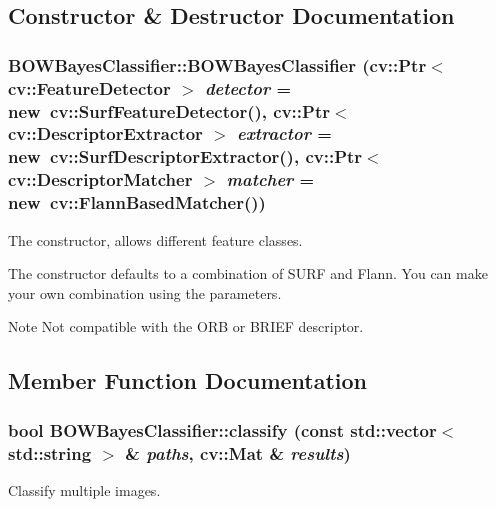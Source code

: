 \subsection{Constructor \& Destructor Documentation}
\hypertarget{classBOWBayesClassifier_ab0714186c37d370dfd71b02ff3de81e6}{
\subsubsection[{BOWBayesClassifier}]{\setlength{\rightskip}{0pt plus 5cm}BOWBayesClassifier::BOWBayesClassifier (cv::Ptr$<$ cv::FeatureDetector $>$ {\em detector} = {\ttfamily new~cv::SurfFeatureDetector()}, \/  cv::Ptr$<$ cv::DescriptorExtractor $>$ {\em extractor} = {\ttfamily new~cv::SurfDescriptorExtractor()}, \/  cv::Ptr$<$ cv::DescriptorMatcher $>$ {\em matcher} = {\ttfamily new~cv::FlannBasedMatcher()})}}
\label{classBOWBayesClassifier_ab0714186c37d370dfd71b02ff3de81e6}


The constructor, allows different feature classes. 

The constructor defaults to a combination of SURF and Flann. You can make your own combination using the parameters.

\begin{DoxyNote}{Note}
Not compatible with the ORB or BRIEF descriptor. 
\end{DoxyNote}


\subsection{Member Function Documentation}
\hypertarget{classBOWBayesClassifier_a3e2cf634f1f63dd14de1ca658b19cb39}{
\subsubsection[{classify}]{\setlength{\rightskip}{0pt plus 5cm}bool BOWBayesClassifier::classify (const std::vector$<$ std::string $>$ \& {\em paths}, \/  cv::Mat \& {\em results})}}
\label{classBOWBayesClassifier_a3e2cf634f1f63dd14de1ca658b19cb39}


Classify multiple images. 

